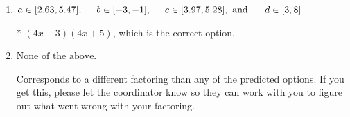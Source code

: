 \documentclass{extbook}[14pt]
\begin{document}
\begin{enumerate}
{\begin{enumerate}[label=\Alph*.]
 $(x -12)(x + 20)$, which corresponds to factoring $x^{2} +8 x -240$.
\item \( a \in [2.63, 5.47], \hspace*{5mm} b \in [-3, -1], \hspace*{5mm} c \in [3.97, 5.28], \text{ and } \hspace*{5mm} d \in [3, 8] \)

* $(4x -3)(4x + 5)$, which is the correct option.
\item \( \text{None of the above.} \)

 Corresponds to a different factoring than any of the predicted options. If you get this, please let the coordinator know so they can work with you to figure out what went wrong with your factoring.
\end{enumerate}

}
\end{enumerate}
\end{document}
